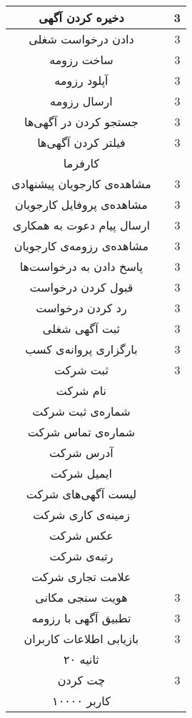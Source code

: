 \begin{longtable}{|c|c|c|}
	\hline
	دخیره کردن آگهی &
	\asjs &
	3 \\
	\hline
	دادن درخواست شغلی &
	\asje &
	3 \\
	\hline
	ساخت رزومه &
	\asjs &
	3 \\
	\hline
	آپلود رزومه &
	\asjs &
	3 \\
	\hline
	ارسال رزومه &
	\asje &
	3 \\
	\hline
	جستجو کردن در آگهی‌ها &
	\asus &
	3 \\
	\hline
	فیلتر کردن آگهی‌ها &
	\asus &
	3 \\
	\hline
	کارفرما &
	\myc &
	\oned \\
	\hline
	مشاهده‌ی کارجویان پیشنهادی &
	\ases &
	3 \\
	\hline
	مشاهده‌ی پروفایل کارجویان &
	\asus &
	3 \\
	\hline
	ارسال پیام دعوت به همکاری &
	\asej &
	3 \\
	\hline
	مشاهده‌ی رزومه‌ی کارجویان &
	\asus &
	3 \\
	\hline
	پاسخ دادن به درخواست‌ها &
	\aser &
	3 \\
	\hline
	قبول کردن درخواست &
	\aser &
	3 \\
	\hline
	رد کردن درخواست &
	\aser &
	3 \\
	\hline
	ثبت آگهی‌ شغلی &
	\ases &
	3 \\
	\hline
	بارگزاری پروانه‌ی کسب &
	\ases &
	3 \\
	\hline
	ثبت شرکت & 
	\ases & 
	3 \\
	\hline
	نام شرکت & 
	\mya & 
	\oneh \\
	\hline
	شماره‌ی ثبت شرکت & 
	\mya & 
	\oneh \\
	\hline
	شماره‌ی تماس شرکت & 
	\mya & 
	\oneh \\
	\hline
	آدرس شرکت & 
	\mya & 
	\oneh \\
	\hline
	ایمیل شرکت & 
	\mya & 
	\oneh \\
	\hline
	لیست آگهی‌های شرکت & 
	\mya & 
	\oneh \\
	\hline
	زمینه‌ی کاری شرکت & 
	\mya & 
	\oneh \\
	\hline
	عکس شرکت & 
	\mya & 
	\oneh \\
	\hline
	رتبه‌ی شرکت & 
	\mya & 
	\oneh \\
	\hline
	علامت تجاری شرکت & 
	\mya & 
	\oneh \\
	\hline
	هویت سنجی مکانی & 
	\asse & 
	3 \\
	\hline
	تطبیق آگهی با رزومه & 
	\assj & 
	3 \\
	\hline
	بازیابی اطلاعات کاربران & 
	\assu & 
	3 \\
	\hline
	۲۰ ثانیه & 
	\myv & 
	\fiveb \\
	\hline
	چت کردن & 
	\asje & 
	3 \\
	\hline
	۱۰۰۰۰ کاربر & 
	\myv & 
	\fiveb \\
	\hline
\end{longtable}
\label{table:domain}

